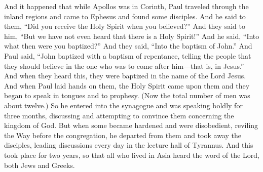 \begin{biblechapter} %
 And it happened that while Apollos was in Corinth, Paul traveled through the inland regions and came to Ephesus and found some disciples.
\verse And he said to them, “Did you receive the Holy Spirit when you believed?” And they said to him, “But we have not even heard that there is a Holy Spirit!”
\verse And he said, “Into what then were you baptized?” And they said, “Into the baptism of John.”
\verse And Paul said, “John baptized with a baptism of repentance, telling the people that they should believe in the one who was to come after him—that is, in Jesus.”
\verse And when they heard this, they were baptized in the name of the Lord Jesus.
\verse And when Paul laid hands on them, the Holy Spirit came upon them and they began to speak in tongues and to prophesy.
\verse (Now the total number of men was about twelve.)
\verse So he entered into the synagogue and was speaking boldly for three months, discussing and attempting to convince them concerning the kingdom of God.
\verse But when some became hardened and were disobedient, reviling the Way before the congregation, he departed from them and took away the disciples, leading discussions every day in the lecture hall of Tyrannus.
\verse And this took place for two years, so that all who lived in Asia heard the word of the Lord, both Jews and Greeks.

\end{biblechapter}
